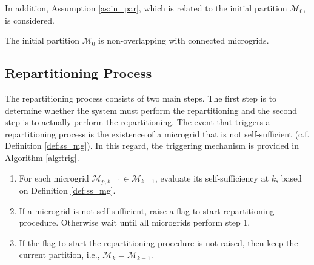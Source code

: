 In addition, Assumption \ref{as:in_par}, which is related to the initial partition $\boldsymbol{\mathcal{M}}_0$, is considered.
\begin{assum}
	\label{as:in_par}
	The initial partition $\boldsymbol{\mathcal{M}}_0$ is non-overlapping with connected microgrids. %
\end{assum}


\subsection{Repartitioning Process}

The repartitioning process consists of two main steps. The first step is to determine whether the system must perform the repartitioning and the second step is to actually perform the repartitioning. The event that triggers a repartitioning process is the existence of a microgrid that is not self-sufficient (c.f. Definition \ref{def:ss_mg}). In this regard, the triggering mechanism is provided in Algorithm \ref{alg:trig}. 
\begin{alg}
	\label{alg:trig}
	  \hfill
	\begin{enumerate}
		\item For each microgrid $\mathcal{M}_{p,k-1} \in\boldsymbol{\mathcal{M}}_{k-1}$, evaluate its self-sufficiency at $k$, based on Definition \ref{def:ss_mg}.
		\item If a microgrid is not self-sufficient, raise a flag to start repartitioning procedure. Otherwise wait until all microgrids perform step 1.
		\item If the flag to start the repartitioning procedure is not raised, then keep the  current partition, i.e., $\boldsymbol{\mathcal{M}}_{k}=\boldsymbol{\mathcal{M}}_{k-1}$. \eod
	\end{enumerate}
\end{alg}

